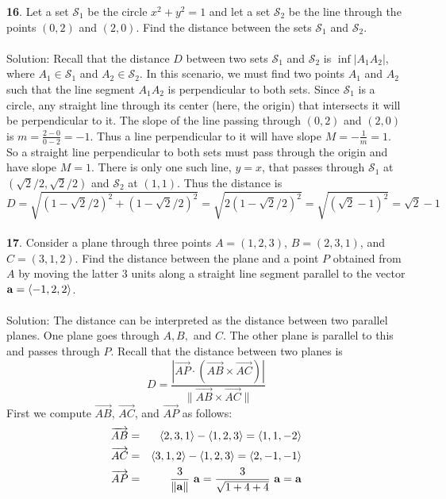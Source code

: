\documentclass[12pt]{amsbook}
\let\cal\mathcal
\newcommand{\la}{\langle}
\newcommand{\ra}{\rangle}
\begin{document}
{\small\bf 16}. Let a set ${\cal S}_1$ be the circle $x^2+y^2=1$ and let
a set ${\cal S}_2$ be the line through the points $(0,2)$ and
$(2,0)$. Find the distance between the sets  ${\cal S}_1$ and
${\cal S}_2$.\\
\\
{\sc Solution}: Recall that the distance $D$ between two sets $\mathcal{S}_1$ and $\mathcal{S}_2$ is $\inf |A_1A_2|$, where $A_1 \in \mathcal{S}_1$ and $A_2 \in \mathcal{S}_2$. In this scenario, we must find two points $A_1$ and $A_2$ such that the line segment $A_1A_2$ is perpendicular to both sets. Since $\mathcal{S}_1$ is a circle, any straight line through its center (here, the origin) that intersects it will be perpendicular to it. The slope of the line passing through $(0,2)$ and $(2,0)$ is $m=\frac{2-0}{0-2}=-1$. Thus a line perpendicular to it will have slope $M=-\frac{1}{m}=1$. So a straight line perpendicular to both sets must pass through the origin and have slope $M=1$. There is only one such line, $y=x$, that passes through $\mathcal{S}_1$ at $(\sqrt{2}/2,\sqrt{2}/2)$ and $\mathcal{S}_2$ at $(1,1)$. Thus the distance is 
$$D=\sqrt{(1-\sqrt{2}/2)^2+(1-\sqrt{2}/2)^2}=\sqrt{2(1-\sqrt{2}/2)^2}=\sqrt{(\sqrt{2}-1)^2}=\sqrt{2}-1$$ 
\\
{\small\bf 17}. Consider a plane through three points $A=(1,2,3)$,
$B=(2,3,1)$, and $C=(3,1,2)$. Find the distance between the plane
and a point $P$ obtained from $A$ by moving the latter 3 units 
along a straight line segment parallel to 
the vector ${\bf a}= \la -1,2,2\ra$.\\
\\
{\sc Solution}: The distance can be interpreted as the distance between two parallel planes. One plane goes through $A,B,$ and $C$. The other plane is parallel to this and passes through $P$. Recall that the distance between two planes is 
$$D=\frac{|\overrightarrow{AP}\cdot(\overrightarrow{AB}\times\overrightarrow{AC})|}{\|\overrightarrow{AB}\times\overrightarrow{AC}\|}$$
First we compute $\overrightarrow{AB}$, $\overrightarrow{AC}$, and $\overrightarrow{AP}$ as follows:
\begin{eqnarray*}
\overrightarrow{AB}&=&\la 2,3,1 \ra - \la 1,2,3 \ra = \la 1,1,-2 \ra \\
\overrightarrow{AC}&=&\la 3,1,2 \ra - \la 1,2,3 \ra = \la 2,-1,-1 \ra \\
\overrightarrow{AP}&=&\frac{3}{\|{\bf a}\|} \ {\bf a} = \frac{3}{\sqrt{1+4+4}} \ {\bf a} = {\bf a} 
\end{eqnarray*}
\\
\end{document}
